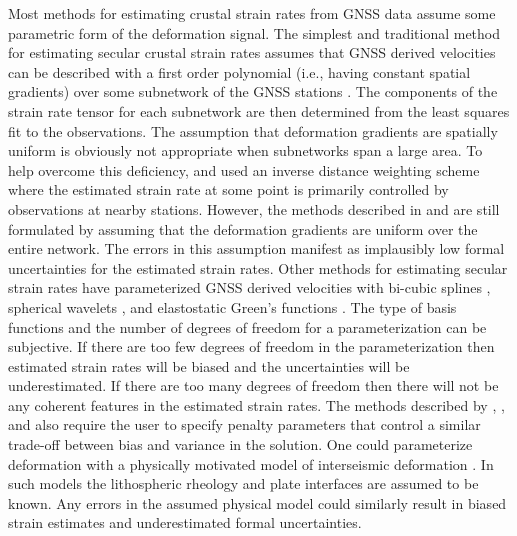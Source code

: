 \documentclass[10pt,letter]{article}
\begin{document}
Most methods for estimating crustal strain rates from GNSS data assume some parametric form of the deformation signal. The simplest and traditional method for estimating secular crustal strain rates assumes that GNSS derived velocities can be described with a first order polynomial (i.e., having constant spatial gradients) over some subnetwork of the GNSS stations \citep[e.g][]{Frank1966,Prescott1976,Savage1986,Feigl1990,Murray2000}. The components of the strain rate tensor  for each subnetwork are then determined from the least squares fit to the observations. The assumption that deformation gradients are spatially uniform is obviously not appropriate when subnetworks span a large area.  To help overcome this deficiency, \citet{Shen1996} and \citet{Shen2015} used an inverse distance weighting scheme where the estimated strain rate at some point is primarily controlled by observations at nearby stations. However, the methods described in \citet{Shen1996} and \citet{Shen2015} are still formulated by assuming that the deformation gradients are uniform over the entire network. The errors in this assumption manifest as implausibly low formal uncertainties for the estimated strain rates. Other methods for estimating secular strain rates have parameterized GNSS derived velocities with bi-cubic splines \citep{Beavan2001}, spherical wavelets \citep{Tape2009}, and elastostatic Green's functions \citep{Sandwell2016}. The type of basis functions and the number of degrees of freedom for a parameterization can be subjective. If there are too few degrees of freedom in the parameterization then estimated strain rates will be biased and the uncertainties will be underestimated. If there are too many degrees of freedom then there will not be any coherent features in the estimated strain rates. The methods described by \citet{Beavan2001}, \citet{Tape2009}, and \citet{Sandwell2016} also require the user to specify penalty parameters that control a similar trade-off between bias and variance in the solution. One could parameterize deformation with a physically motivated model of interseismic deformation \citep[e.g.,][]{Meade2005,McCaffrey2007}. In such models the lithospheric rheology and plate interfaces are assumed to be known. Any errors in the assumed physical model could similarly result in biased strain estimates and underestimated formal uncertainties. 
\end{document}
